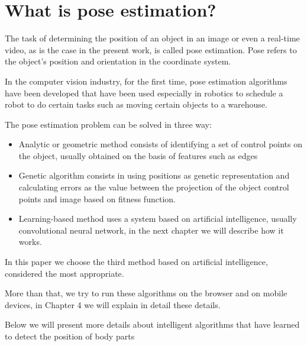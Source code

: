 \section{What is pose estimation?}

The task of determining the position of an object in an image 
or even a real-time video, as is the case in the present work, is called pose estimation.
Pose refers to the object’s position and orientation in the coordinate system.

In the computer vision industry, for the first time, pose estimation algorithms 
have been developed that have been used especially in robotics to schedule a robot to 
do certain tasks such as moving certain objects to a warehouse. \cite{book.computer.vision.2001}

The pose estimation problem can be solved in three way:
\begin{itemize}
  \item Analytic or geometric method consists of identifying a set of control points 
    on the object, usually obtained on the basis of features such as edges
  \item Genetic algorithm consists in using positions as genetic representation and calculating errors
   as the value between the projection of the object control points and image based on fitness function.
 
 \item Learning-based  method uses a system based on artificial intelligence, usually convolutional neural network,
 in the next chapter we will describe how it works.
\end{itemize} 

In this paper we choose the third method based on artificial intelligence, considered the most appropriate.

More than that, we try to run these algorithms on the browser and on mobile devices, 
 in Chapter 4 we will explain in detail these details.

Below we will present more details about intelligent algorithms that have learned to detect the position of body parts